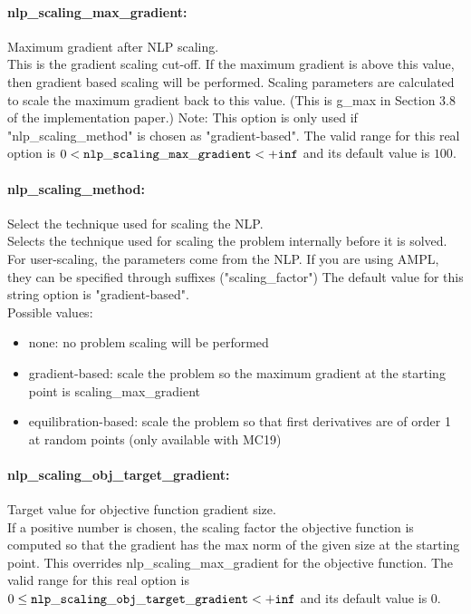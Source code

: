 \paragraph{nlp\_scaling\_max\_gradient:}\label{sec:nlp_scaling_max_gradient} Maximum gradient after NLP scaling. $\;$ \\
 This is the gradient scaling cut-off. If the
maximum gradient is above this value, then
gradient based scaling will be performed. Scaling
parameters are calculated to scale the maximum
gradient back to this value. (This is g\_max in
Section 3.8 of the implementation paper.) Note:
This option is only used if
"nlp\_scaling\_method" is chosen as
"gradient-based". The valid range for this real option is 
$0 <  {\tt nlp\_scaling\_max\_gradient } <  {\tt +inf}$
and its default value is $100$.


\paragraph{nlp\_scaling\_method:}\label{sec:nlp_scaling_method} Select the technique used for scaling the NLP. $\;$ \\
 Selects the technique used for scaling the
problem internally before it is solved. For
user-scaling, the parameters come from the NLP.
If you are using AMPL, they can be specified
through suffixes ("scaling\_factor")
The default value for this string option is "gradient-based".
\\ 
Possible values:
\begin{itemize}
   \item none: no problem scaling will be performed
   \item gradient-based: scale the problem so the maximum gradient at
the starting point is scaling\_max\_gradient
   \item equilibration-based: scale the problem so that first derivatives are
of order 1 at random points (only available
with MC19)
\end{itemize}

\paragraph{nlp\_scaling\_obj\_target\_gradient:}\label{sec:nlp_scaling_obj_target_gradient} Target value for objective function gradient size. $\;$ \\
 If a positive number is chosen, the scaling
factor the objective function is computed so that
the gradient has the max norm of the given size
at the starting point.  This overrides
nlp\_scaling\_max\_gradient for the objective
function. The valid range for this real option is 
$0 \le {\tt nlp\_scaling\_obj\_target\_gradient } <  {\tt +inf}$
and its default value is $0$.


